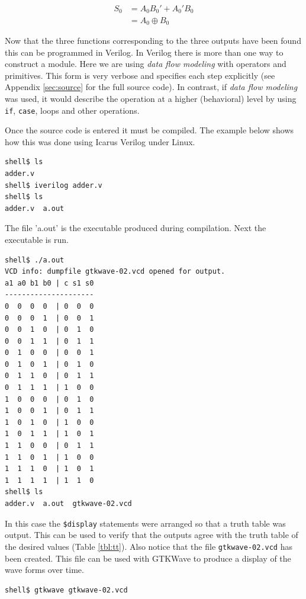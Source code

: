 \documentclass[12pt]{article}
\begin{document}
\begin{align}
S_0 &= A_0 B_0' + A_0' B_0 \label{eq:s0sop} \\
	&= A_0 \oplus B_0 \label{eq:s0}
\end{align}

Now that the three functions corresponding to the three outputs have
been found this can be programmed in Verilog.
In Verilog there is more than one way to construct a module.
Here we are using \emph{data flow modeling} with operators and
primitives.
This form is very verbose and specifies each step explicitly
(see Appendix \ref{sec:source} for the full source code).
In contrast, if \emph{data flow modeling} was used, it would
describe the operation at a higher (behavioral) level by using
\verb+if+, \verb+case+, loops and other operations.

Once the source code is entered it must be compiled.
The example below shows how this was done using Icarus Verilog \cite{VERILOG}
under Linux.

\begin{verbatim}
shell$ ls
adder.v
shell$ iverilog adder.v
shell$ ls
adder.v  a.out
\end{verbatim}

The file 'a.out' is the executable produced during compilation.
Next the executable is run.

\begin{verbatim}
shell$ ./a.out 
VCD info: dumpfile gtkwave-02.vcd opened for output.
a1 a0 b1 b0 | c s1 s0
---------------------
0  0  0  0  | 0  0  0
0  0  0  1  | 0  0  1
0  0  1  0  | 0  1  0
0  0  1  1  | 0  1  1
0  1  0  0  | 0  0  1
0  1  0  1  | 0  1  0
0  1  1  0  | 0  1  1
0  1  1  1  | 1  0  0
1  0  0  0  | 0  1  0
1  0  0  1  | 0  1  1
1  0  1  0  | 1  0  0
1  0  1  1  | 1  0  1
1  1  0  0  | 0  1  1
1  1  0  1  | 1  0  0
1  1  1  0  | 1  0  1
1  1  1  1  | 1  1  0
shell$ ls
adder.v  a.out  gtkwave-02.vcd
\end{verbatim}

In this case the \verb+$display+ statements were arranged so that
a truth table was output.
This can be used to verify that the outputs agree with the
truth table of the desired values (Table \ref{tbl:tt}).
Also notice that the file \verb+gtkwave-02.vcd+ has been created.
This file can be used with GTKWave to produce a display of the wave
forms over time.

\begin{verbatim}
shell$ gtkwave gtkwave-02.vcd
\end{verbatim}
\end{document}

